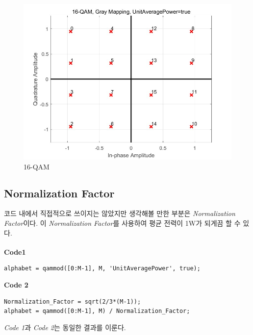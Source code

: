 \documentclass{article}
\newcommand{\bd}{\textbf} %
\begin{document}
\begin{figure}
	\includegraphics[width=\textwidth]{16qamunit.jpg}
	\caption{16-QAM}
\end{figure}
\subsection{Normalization Factor}
코드 내에서 직접적으로 쓰이지는 않았지만 생각해볼 만한 부분은 \textsl{Normalization Factor}이다. 이 \textsl{Normalization Factor}를 사용하여 평균 전력이 1W가 되게끔 할 수 있다.\\
\\
\bd{Code1}
\begin{lstlisting}[style=Matlab-editor, frame=single]
alphabet = qammod([0:M-1], M, 'UnitAveragePower', true);
\end{lstlisting}
\vspace{0.1cm}
\bd{Code 2}
\begin{lstlisting}[style=Matlab-editor, frame=single]
Normalization_Factor = sqrt(2/3*(M-1));
alphabet = qammod([0:M-1], M) / Normalization_Factor;
\end{lstlisting}
\textsl{Code 1}과 \textsl{Code 2}는 동일한 결과를 이룬다.\\
\end{document}

